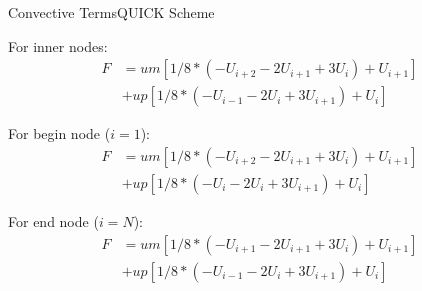 \documentclass{beamer}
\begin{document}
\begin{frame}{Convective Terms}{QUICK Scheme}
	
	For inner nodes:
	\begin{equation}
		\begin{split}
			F &= um \left[ 1/8 * \left( -U_{i+2} - 2 U_{i+1} + 3 U_{i} \right) + U_{i+1} \right] \\
			&+ up \left[ 1/8 * \left( -U_{i-1} - 2 U_{i} + 3 U_{i+1} \right) + U_{i} \right]
		\end{split}
	\end{equation}
	
	For begin node ($i=1$):
	\begin{equation}
		\begin{split}
			F &= um \left[ 1/8 * \left( -U_{i+2} - 2 U_{i+1} + 3 U_{i} \right) + U_{i+1} \right] \\
			&+ up \left[ 1/8 * \left( -U_{i} - 2 U_{i} + 3 U_{i+1} \right) + U_{i} \right]
		\end{split}
	\end{equation}
	
	For end node ($i=N$):
	\begin{equation}
		\begin{split}
			F &= um \left[ 1/8 * \left( -U_{i+1} - 2 U_{i+1} + 3 U_{i} \right) + U_{i+1} \right] \\
			&+ up \left[ 1/8 * \left( -U_{i-1} - 2 U_{i} + 3 U_{i+1} \right) + U_{i} \right]
		\end{split}
	\end{equation}
	
\end{frame}
\end{document}
